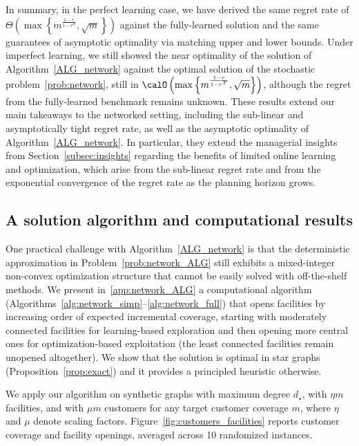 \documentclass[blindrev]{informs3noheader}
\begin{document}
In summary, in the perfect learning case, we have derived the same regret rate of $\Theta\left(\max\left\{m^{\frac{1-r}{1-r^T}},\sqrt{m}\right\}\right)$ against the fully-learned solution and the same guarantees of asymptotic optimality via matching upper and lower bounds. Under imperfect learning, we still showed the near optimality of the solution of Algorithm~\ref{ALG_network} against the optimal solution of the stochastic problem~\eqref{prob:network}, still in $\calO\left(\max\left\{m^{\frac{1-r}{1-r^T}},\sqrt{m}\right\}\right)$, although the regret from the fully-learned benchmark remains unknown. These results extend our main takeaways to the networked setting, including the sub-linear and asymptotically tight regret rate, as well as the asymptotic optimality of Algorithm~\ref{ALG_network}. In particular, they extend the managerial insights from Section~\ref{subsec:insights} regarding the benefits of limited online learning and optimization, which arise from the sub-linear regret rate and from the exponential convergence of the regret rate as the planning horizon grows.

\subsection{A solution algorithm and computational results}
\label{subsec:solution}

One practical challenge with Algorithm~\ref{ALG_network} is that the deterministic approximation in Problem~\eqref{prob:network_ALG} still exhibits a mixed-integer non-convex optimization structure that cannot be easily solved with off-the-shelf methods. We present in~\ref{app:network_ALG} a computational algorithm (Algorithms~\ref{alg:network_simp}--\ref{alg:network_full}) that opens facilities by increasing order of expected incremental coverage, starting with moderately connected facilities for learning-based exploration and then opening more central ones for optimization-based exploitation (the least connected facilities remain unopened altogether). We show that the solution is optimal in star graphs (Proposition~\ref{prop:exact}) and it provides a principled heuristic otherwise.

We apply our algorithm on synthetic graphs with maximum degree $d_\star$, with $\eta m$ facilities, and with $\mu m$ customers for any target customer coverage $m$, where $\eta$ and $\mu$ denote scaling factors. Figure~\ref{fig:customers_facilities} reports customer coverage and facility openings, averaged across 10 randomized instances.
\end{document}
